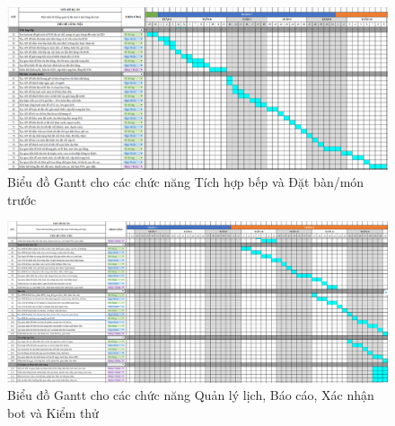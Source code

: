 \begin{figure}[H]
    \centering
    \includegraphics[width=\linewidth]{Images/gantt_3}
    \vspace{0.5cm}
    \caption{Biểu đồ Gantt cho các chức năng Tích hợp bếp và Đặt bàn/món trước}
    \label{fig:gantt_kitchen_booking}
\end{figure}

\begin{figure}[H]
    \centering
    \includegraphics[width=\linewidth]{Images/gantt_4}
    \vspace{0.5cm}
    \caption{Biểu đồ Gantt cho các chức năng Quản lý lịch, Báo cáo, Xác nhận bot và Kiểm thử}
    \label{fig:gantt_schedule_report_test}
\end{figure}